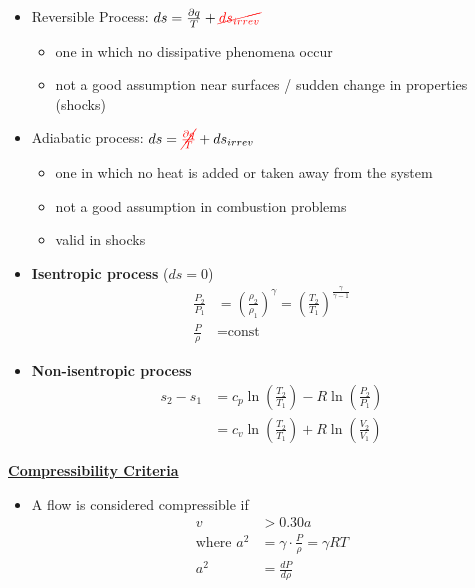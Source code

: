 \begin{itemize}
    \item Reversible Process: $ds = \frac{\partial q}{T} + \color{red}\cancel{ds_{irrev}}$\color{black}
    \begin{itemize}
        \item one in which no dissipative phenomena occur
        \item not a good assumption near surfaces / sudden change in properties (shocks)
    \end{itemize}
    \item Adiabatic process: $ds = \color{red}\cancel{\frac{\partial q}{T}}\color{black}+ds_{irrev}$
    \begin{itemize}
        \item one in which no heat is added or taken away from the system
        \item not a good assumption in combustion problems
        \item valid in shocks
    \end{itemize}
    \item \textbf{Isentropic process} ($ds=0$)
    \begin{align*}
        \frac{P_2}{P_1} &= \left(\frac{\rho_2}{\rho_1}\right)^{\gamma} = \left(\frac{T_2}{T_1}\right)^{\frac{\gamma}{\gamma-1}} \\
        \frac{P}{\rho} &= \text{const}
    \end{align*}
    \item \textbf{Non-isentropic process}
    \begin{align*}
        s_2 - s_1 &= c_p \ln\left(\frac{T_2}{T_1}\right) - R \ln\left(\frac{P_2}{P_1}\right) \\
        &= c_v \ln\left(\frac{T_2}{T_1}\right)+ R \ln\left(\frac{V_2}{V_1}\right)
    \end{align*}
\end{itemize}

\Large \textbf{\underline{\color{blue}Compressibility Criteria\color{black}}}

\begin{itemize}
    \item A flow is considered compressible if
    \begin{align*}
        v &> 0.30 a \\
        \text{where } a^2 &= \gamma \cdot \frac{P}{\rho} = \gamma R T \\
        a^2 &= \frac{dP}{d\rho}
    \end{align*}
\end{itemize}

